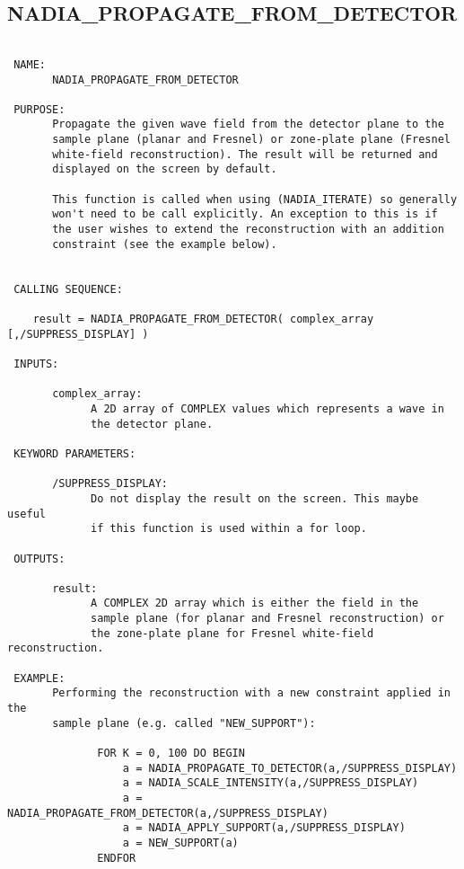 \subsection{NADIA\_PROPAGATE\_FROM\_DETECTOR}
\begin{verbatim}

 NAME:
       NADIA_PROPAGATE_FROM_DETECTOR

 PURPOSE:
       Propagate the given wave field from the detector plane to the 
       sample plane (planar and Fresnel) or zone-plate plane (Fresnel
       white-field reconstruction). The result will be returned and
       displayed on the screen by default.

       This function is called when using (NADIA_ITERATE) so generally
       won't need to be call explicitly. An exception to this is if
       the user wishes to extend the reconstruction with an addition
       constraint (see the example below).


 CALLING SEQUENCE:

	result = NADIA_PROPAGATE_FROM_DETECTOR( complex_array [,/SUPPRESS_DISPLAY] )

 INPUTS:

       complex_array:
             A 2D array of COMPLEX values which represents a wave in
             the detector plane.

 KEYWORD PARAMETERS:

       /SUPPRESS_DISPLAY:
             Do not display the result on the screen. This maybe useful
             if this function is used within a for loop. 

 OUTPUTS:

       result:
             A COMPLEX 2D array which is either the field in the
             sample plane (for planar and Fresnel reconstruction) or
             the zone-plate plane for Fresnel white-field reconstruction.

 EXAMPLE:
       Performing the reconstruction with a new constraint applied in the
       sample plane (e.g. called "NEW_SUPPORT"):

              FOR K = 0, 100 DO BEGIN 
                  a = NADIA_PROPAGATE_TO_DETECTOR(a,/SUPPRESS_DISPLAY)
                  a = NADIA_SCALE_INTENSITY(a,/SUPPRESS_DISPLAY)
                  a = NADIA_PROPAGATE_FROM_DETECTOR(a,/SUPPRESS_DISPLAY)
                  a = NADIA_APPLY_SUPPORT(a,/SUPPRESS_DISPLAY)
                  a = NEW_SUPPORT(a)
              ENDFOR 


\end{verbatim}






